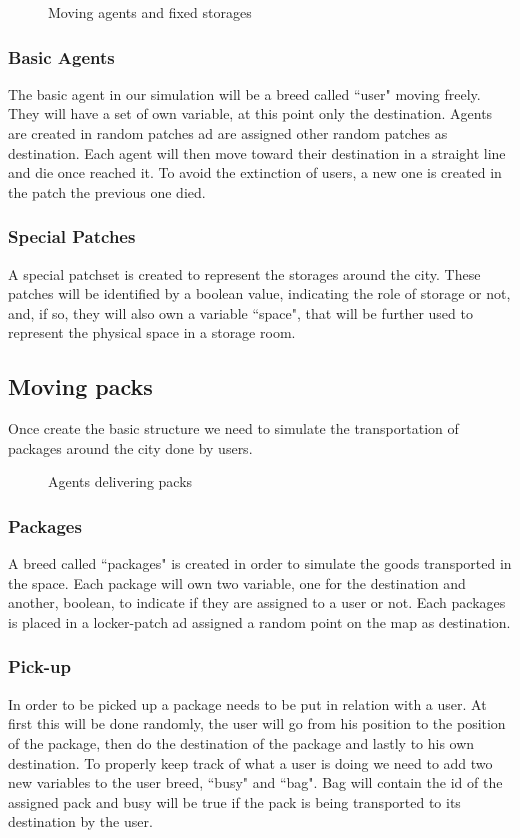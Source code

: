 \documentclass[11pt,a4paper]{article}
\begin{document}
\begin{figure}[h!]
\centering
\caption{Moving agents and fixed storages}
\end{figure}

\subsubsection*{Basic Agents}
The basic agent in our simulation will be a breed called “user" moving freely.
They will have a set of own variable, at this point only the destination.
Agents are created in random patches ad are assigned other random patches as destination.
Each agent will then move toward their destination in a straight line and die once reached it.
To avoid the extinction of users, a new one is created in the patch the previous one died.

\subsubsection*{Special Patches}
A special patchset is created to represent the storages around the city.
These patches will be identified by a boolean value, indicating the role of storage or not, and, if so, they will also own a variable “space", that will be further used to represent the physical space in a storage room.

\newpage
\subsection{Moving packs}
Once create the basic structure we need to simulate the transportation of packages around the city done by users.
\medskip
\begin{figure}[h!]
\centering
\caption{Agents delivering packs}
\end{figure}
\medskip
\subsubsection*{Packages}
A breed called “packages" is created in order to simulate the goods transported in the space. Each package will own two variable, one for the destination and another, boolean, to indicate if they are assigned to a user or not.
Each packages is placed in a locker-patch ad assigned a random point on the map as destination.

\medskip
\subsubsection*{Pick-up}
In order to be picked up a package needs to be put in relation with a user.
At first this will be done randomly, the user will go from his position to the position of the package, then do the destination of the package and lastly to his own destination.
To properly keep track of what a user is doing we need to add two new variables to the user breed, “busy" and “bag". Bag will contain the id of the assigned pack and busy will be true if the pack is being transported to its destination by the user.
\end{document}
